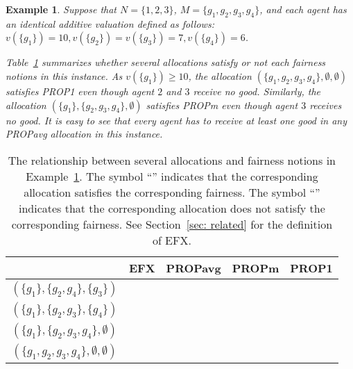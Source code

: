 \documentclass[11pt]{article}
\newcommand{\cmark}{\ding{51}}%
\newcommand{\xmark}{\ding{55}}%
\newtheorem{example}[theorem]{Example}
\newcommand{\PROPavg}{\textsf{PROPavg}\xspace}
\newcommand{\PROPm}{\textsf{PROPm}\xspace}
\newcommand{\PROP}{\textsf{PROP}\xspace}
\newcommand{\EFX}{\textsf{EFX}\xspace}
\begin{document}
\begin{example}\label{example1}
Suppose that $N=\{1, 2, 3\}$, $M=\{g_1, g_2, g_3, g_4\}$, and each agent has an identical additive valuation defined as follows: $v(\{g_1\})=10, v(\{g_2\})=v(\{g_3\})=7, v(\{g_4\})=6$.

Table~\ref{table:example} summarizes whether several allocations satisfy or not each fairness notions in this instance.
As $v(\{g_1\}) \ge 10$, the allocation $(\{g_1, g_2, g_3, g_4\}, \emptyset, \emptyset)$ satisfies {\PROP}1 even though agent $2$ and $3$ receive no good.
Similarly, the allocation $(\{g_1\}, \{g_2, g_3, g_4\}, \emptyset)$ satisfies \PROPm even though agent $3$ receives no good.
It is easy to see that every agent has to receive at least one good in any \PROPavg allocation in this instance.


\end{example}

\begin{table}[bth]
 \caption{The relationship between several allocations and fairness notions in Example~\ref{example1}. The symbol ``\cmark'' indicates that the corresponding allocation satisfies the corresponding fairness. The symbol ``\xmark'' indicates that the corresponding allocation does not satisfy the corresponding fairness. See Section~\ref{sec: related} for the definition of EFX.}
 \label{table:example}
 \centering
  \begin{tabular}{c|c|c|c|c}\hline
	    & \EFX & \PROPavg & \PROPm & {\PROP}1 \\ \hline
	$(\{g_1\}, \{g_2, g_4\}, \{g_3\})$ &  \cmark & \cmark & \cmark & \cmark \\ \hline
	$(\{g_1\}, \{g_2, g_3\}, \{g_4\})$ &   \xmark & \cmark & \cmark & \cmark \\ \hline
	$(\{g_1\}, \{g_2, g_3, g_4\}, \emptyset)$ &  \xmark & \xmark & \cmark & \cmark \\ \hline
	$(\{g_1, g_2, g_3, g_4\}, \emptyset, \emptyset)$ & \xmark & \xmark & \xmark & \cmark \\ \hline
  \end{tabular}
\end{table}
\end{document}
